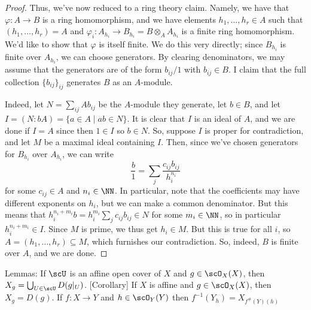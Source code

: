 \begin{proof}
	Thus, we've now reduced to a ring theory claim. Namely, we have that $\varphi : A \to B$ is a ring homomorphism, and we have elements $h_1,\ldots,h_r \in A$ such that $(h_1,\ldots,h_r) = A$ and $\varphi_i : A_{h_i} \to B_{h_i} = B \otimes_A A_{h_i}$ is a finite ring homomorphism. We'd like to show that $\varphi$ is itself finite. We do this very directly; since $B_{h_i}$ is finite over $A_{h_i}$, we can choose generators. By clearing denominators, we may assume that the generators are of the form $b_{ij}/1$ with $b_{ij} \in B$. I claim that the full collection $\{b_{ij}\}_{ij}$ generates $B$ as an $A$-module.
	
	Indeed, let $N = \sum_{ij} Ab_{ij}$ be the $A$-module they generate, let $b \in B$, and let $I = (N : bA) = \{ a \in A \mid ab \in N \}$. It is clear that $I$ is an ideal of $A$, and we are done if $I = A$ since then $1 \in I$ so $b \in N$. So, suppose $I$ is proper for contradiction, and let $M$ be a maximal ideal containing $I$. Then, since we've chosen generators for $B_{h_i}$ over $A_{h_i}$, we can write
	\[ \frac{b}{1} = \sum_j \frac{c_{ij}b_{ij}}{h_i^{n_i}} \]
	for some $c_{ij} \in A$ and $n_i \in \NN$. In particular, note that the coefficients may have different exponents on $h_i$, but we can make a common denominator. But this means that $h_i^{n_i+m_i}b = h_i^{m_i}\sum_j c_{ij}b_{ij} \in N$ for some $m_i \in \NN$, so in particular $h_i^{n_i+m_i} \in I$. Since $M$ is prime, we thus get $h_i \in M$. But this is true for all $i$, so $A = (h_1,\ldots,h_r) \subseteq M$, which furnishes our contradiction. So, indeed, $B$ is finite over $A$, and we are done.
\end{proof}

Lemmas:
	If $\scU$ is an affine open cover of $X$ and $g \in \scO_X(X)$, then $X_g = \bigcup_{U \in \scU} D(g|_U)$.
	[Corollary] If $X$ is affine and $g \in \scO_X(X)$, then $X_g = D(g)$.
	If $f : X \to Y$ and $h \in \scO_Y(Y)$ then $f^{-1}(Y_h) = X_{f^\#(Y)(h)}$
